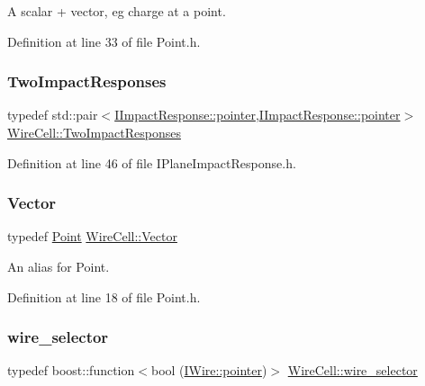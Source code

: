 A scalar + vector, eg charge at a point. 



Definition at line 33 of file Point.\+h.

\mbox{\label{namespace_wire_cell_ae163f7e69ff1625cf269418b35194d37}} 
\subsubsection{\texorpdfstring{Two\+Impact\+Responses}{TwoImpactResponses}}
{\footnotesize\ttfamily typedef std\+::pair$<$\hyperlink{class_wire_cell_1_1_interface_a09c548fb8266cfa39afb2e74a4615c37}{I\+Impact\+Response\+::pointer},\hyperlink{class_wire_cell_1_1_interface_a09c548fb8266cfa39afb2e74a4615c37}{I\+Impact\+Response\+::pointer}$>$ \hyperlink{namespace_wire_cell_ae163f7e69ff1625cf269418b35194d37}{Wire\+Cell\+::\+Two\+Impact\+Responses}}



Definition at line 46 of file I\+Plane\+Impact\+Response.\+h.

\mbox{\label{namespace_wire_cell_aa3c82d3ba85f032b0d278b7004846800}} 
\subsubsection{\texorpdfstring{Vector}{Vector}}
{\footnotesize\ttfamily typedef \hyperlink{namespace_wire_cell_ab2b2565fa6432efbb4513c14c988cda9}{Point} \hyperlink{namespace_wire_cell_aa3c82d3ba85f032b0d278b7004846800}{Wire\+Cell\+::\+Vector}}



An alias for Point. 



Definition at line 18 of file Point.\+h.

\mbox{\label{namespace_wire_cell_a9d7058ef4d388953ee9d03ff51509e51}} 
\subsubsection{\texorpdfstring{wire\+\_\+selector}{wire\_selector}}
{\footnotesize\ttfamily typedef boost\+::function$<$bool (\hyperlink{class_wire_cell_1_1_i_data_aff870b3ae8333cf9265941eef62498bc}{I\+Wire\+::pointer})$>$ \hyperlink{namespace_wire_cell_a9d7058ef4d388953ee9d03ff51509e51}{Wire\+Cell\+::wire\+\_\+selector}}



